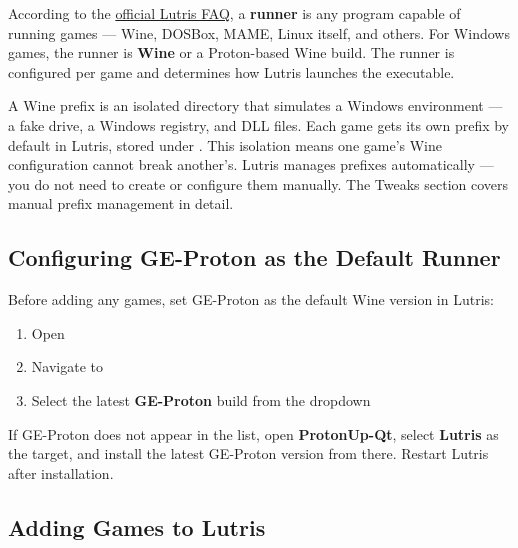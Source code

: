 \documentclass{article}
\begin{document}
\begin{tcolorbox}[arc=12pt, outer arc=10pt,
	colback=blue!4!white, colframe=blue!40!black,
	title=\textbf{What is a Runner?}]
	According to the \href{https://lutris.net/faq}{official Lutris FAQ}, a
	\textbf{runner} is any program capable of running games --- Wine, DOSBox, MAME,
	Linux itself, and others. For Windows games, the runner is \textbf{Wine} or a
	Proton-based Wine build. The runner is configured per game and determines how
	Lutris launches the executable.
\end{tcolorbox}

\begin{tcolorbox}[arc=12pt, outer arc=10pt,
	colback=blue!4!white, colframe=blue!40!black,
	title=\textbf{What is a Wine Prefix?}]
	A Wine prefix is an isolated directory that simulates a Windows environment ---
	a fake  drive, a Windows registry, and DLL files. Each game gets
	its own prefix by default in Lutris, stored under
	. This isolation means one game's Wine configuration cannot
	break another's. Lutris manages prefixes automatically --- you do not need to
	create or configure them manually. The Tweaks section covers manual prefix
	management in detail.
\end{tcolorbox}

\subsection{Configuring GE-Proton as the Default Runner}

Before adding any games, set GE-Proton as the default Wine version in Lutris:

\begin{enumerate}[leftmargin=1.5em, nosep, label={\arabic*.}]
	\item Open 
	\item Navigate to 
	\item Select the latest \textbf{GE-Proton} build from the dropdown
\end{enumerate}

\noindent If GE-Proton does not appear in the list, open \textbf{ProtonUp-Qt},
select \textbf{Lutris} as the target, and install the latest GE-Proton version
from there. Restart Lutris after installation.

\subsection{Adding Games to Lutris}
\end{document}
